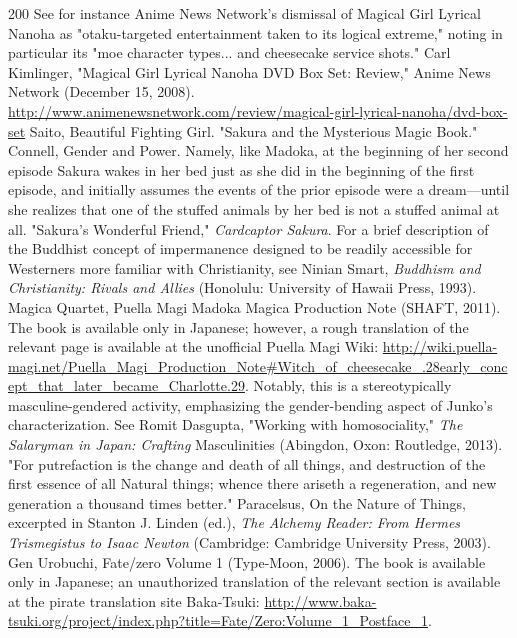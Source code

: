 \begin{thebibliography}{200}
    See for instance Anime News Network's dismissal of Magical Girl Lyrical Nanoha as "otaku-targeted entertainment taken to its logical extreme," noting in particular its "moe character types... and cheesecake service shots." Carl Kimlinger, "Magical Girl Lyrical Nanoha DVD Box Set: Review," Anime News Network (December 15, 2008). \url{http://www.animenewsnetwork.com/review/magical-girl-lyrical-nanoha/dvd-box-set}
    Saito, Beautiful Fighting Girl.
    "Sakura and the Mysterious Magic Book."
    Connell, Gender and Power.
    Namely, like Madoka, at the beginning of her second episode Sakura wakes in her bed just as she did in the beginning of the first episode, and initially assumes the events of the prior episode were a dream—until she realizes that one of the stuffed animals by her bed is not a stuffed animal at all. "Sakura's Wonderful Friend," \emph{Cardcaptor Sakura}.
    For a brief description of the Buddhist concept of impermanence designed to be readily accessible for Westerners more familiar with Christianity, see Ninian Smart, \emph{Buddhism and Christianity: Rivals and Allies} (Honolulu: University of Hawaii Press, 1993).
    Magica Quartet, Puella Magi Madoka Magica Production Note (SHAFT, 2011). The book is available only in Japanese; however, a rough translation of the relevant page is available at the unofficial Puella Magi Wiki: \url{http://wiki.puella-magi.net/Puella_Magi_Production_Note\#Witch_of_cheesecake_.28early_concept_that_later_became_Charlotte.29}.
    Notably, this is a stereotypically masculine-gendered activity, emphasizing the gender-bending aspect of Junko's characterization. See Romit Dasgupta, "Working with homosociality," \emph{The Salaryman in Japan: Crafting} Masculinities (Abingdon, Oxon: Routledge, 2013).
    "For putrefaction is the change and death of all things, and destruction of the first essence of all Natural things; whence there ariseth a regeneration, and new generation a thousand times better." Paracelsus, On the Nature of Things, excerpted in Stanton J. Linden (ed.), \emph{The Alchemy Reader: From Hermes Trismegistus to Isaac Newton} (Cambridge: Cambridge University Press, 2003).
    Gen Urobuchi, Fate/zero Volume 1 (Type-Moon, 2006). The book is available only in Japanese; an unauthorized translation of the relevant section is available at the pirate translation site Baka-Tsuki: \url{http://www.baka-tsuki.org/project/index.php?title=Fate/Zero:Volume_1_Postface_1}.

\end{thebibliography}
